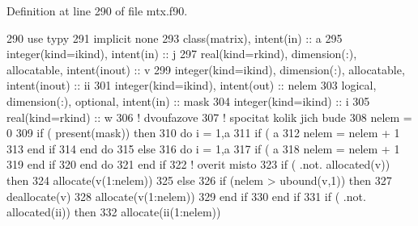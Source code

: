 Definition at line 290 of file mtx.\+f90.


\begin{DoxyCode}
290         \textcolor{keywordtype}{use }typy
291         \textcolor{keywordtype}{implicit none}
293         \textcolor{keywordtype}{class}(matrix), \textcolor{keywordtype}{intent(in)} :: a
295         \textcolor{keywordtype}{integer(kind=ikind)}, \textcolor{keywordtype}{intent(in)} :: j
297         \textcolor{keywordtype}{real(kind=rkind)}, \textcolor{keywordtype}{dimension(:)}, \textcolor{keywordtype}{allocatable}, \textcolor{keywordtype}{intent(inout)} :: v
299         \textcolor{keywordtype}{integer(kind=ikind)}, \textcolor{keywordtype}{dimension(:)}, \textcolor{keywordtype}{allocatable}, \textcolor{keywordtype}{intent(inout)} :: ii
301         \textcolor{keywordtype}{integer(kind=ikind)}, \textcolor{keywordtype}{intent(out)} :: nelem
303         \textcolor{keywordtype}{logical}, \textcolor{keywordtype}{dimension(:)}, \textcolor{keywordtype}{optional}, \textcolor{keywordtype}{intent(in)} :: mask
304         \textcolor{keywordtype}{integer(kind=ikind)} :: i
305         \textcolor{keywordtype}{real(kind=rkind)} :: w
306         \textcolor{comment}{! dvoufazove
}
307         \textcolor{comment}{! spocitat kolik jich bude
}
308         nelem = 0
309         \textcolor{keywordflow}{if} ( \textcolor{keyword}{present}(mask)) then
310             \textcolor{keywordflow}{do} i = 1,a%
311                 \textcolor{keywordflow}{if} ( a%
312                     nelem = nelem + 1
313 \textcolor{keyword}{                end }if
314 \textcolor{keyword}{            end }do
315         else
316             \textcolor{keywordflow}{do} i = 1,a%
317                 \textcolor{keywordflow}{if} ( a%
318                     nelem = nelem + 1
319 \textcolor{keyword}{                end }if
320 \textcolor{keyword}{            end }do
321 \textcolor{keyword}{        end }if
322         \textcolor{comment}{! overit misto
}
323         \textcolor{keywordflow}{if} ( .not. \textcolor{keyword}{allocated}(v)) then
324         \textcolor{keyword}{allocate}(v(1:nelem))
325         else
326             \textcolor{keywordflow}{if} (nelem > ubound(v,1)) then
327                 \textcolor{keyword}{deallocate}(v)
328                 \textcolor{keyword}{allocate}(v(1:nelem))
329 \textcolor{keyword}{            end }if
330 \textcolor{keyword}{        end }if
331         \textcolor{keywordflow}{if} ( .not. \textcolor{keyword}{allocated}(ii)) then
332         \textcolor{keyword}{allocate}(ii(1:nelem))

\end{DoxyCode}
